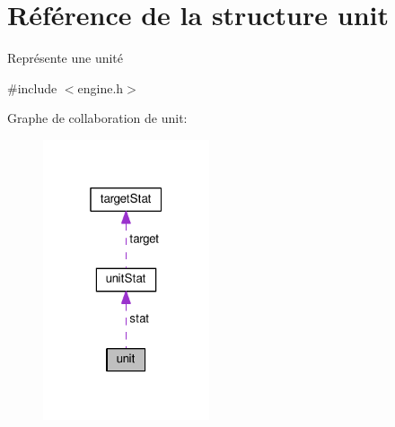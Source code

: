 \hypertarget{structunit}{}\section{Référence de la structure unit}
\label{structunit}


Représente une unité  




{\ttfamily \#include $<$engine.\+h$>$}



Graphe de collaboration de unit\+:\nopagebreak
\begin{figure}[H]
\begin{center}
\leavevmode
\includegraphics[width=139pt]{structunit__coll__graph}
\end{center}
\end{figure}
